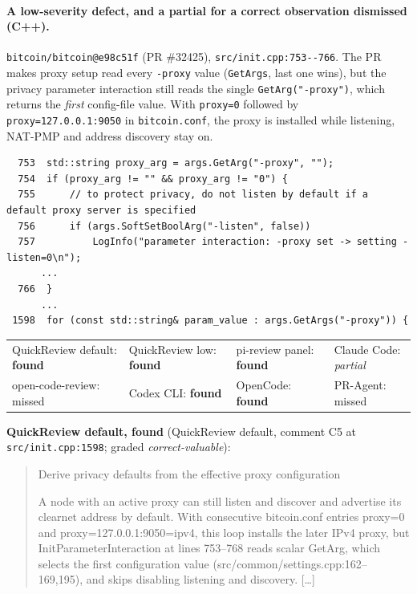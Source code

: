 \documentclass[11pt,a4paper]{article}
\newcommand{\code}[1]{\texttt{#1}}
\begin{document}
\paragraph{A low-severity defect, and a partial for a correct
observation dismissed (C++).} \code{bitcoin/\allowbreak{}bitcoin@e98c51f} (PR \#32425),
\code{src/init.cpp:753-{}-766}. The PR makes proxy setup read every
\code{-proxy} value (\code{GetArgs}, last one wins), but the privacy
parameter interaction still reads the single \code{GetArg("-proxy")},
which returns the \emph{first} config-file value. With \code{proxy=0}
followed by \code{proxy=127.0.0.1:9050} in \code{bitcoin.conf}, the proxy
is installed while listening, NAT-PMP and address discovery stay on.
{\scriptsize
\begin{verbatim}
  753  std::string proxy_arg = args.GetArg("-proxy", "");
  754  if (proxy_arg != "" && proxy_arg != "0") {
  755      // to protect privacy, do not listen by default if a default proxy server is specified
  756      if (args.SoftSetBoolArg("-listen", false))
  757          LogInfo("parameter interaction: -proxy set -> setting -listen=0\n");
      ...
  766  }
      ...
 1598  for (const std::string& param_value : args.GetArgs("-proxy")) {
\end{verbatim}
}
\begin{center}\footnotesize
\begin{tabular}{@{}llll@{}}
\hline
QuickReview default: \textbf{found} & QuickReview low: \textbf{found} & pi-review panel: \textbf{found} & Claude Code: \emph{partial} \\
open-code-review: missed & Codex CLI: \textbf{found} & OpenCode: \textbf{found} & PR-Agent: missed \\
\hline
\end{tabular}
\end{center}
\noindent\textbf{QuickReview default, found} (QuickReview default, comment C5 at \code{src/\allowbreak{}init.cpp:1598}; graded \emph{correct-valuable}):
\begin{quote}\small
Derive privacy defaults from the effective proxy configuration\par A node with an active proxy can still listen and discover and advertise its clearnet address by default. With consecutive bitcoin.conf entries proxy=0 and proxy=127.0.0.1:9050=ipv4, this loop installs the later IPv4 proxy, but InitParameterInteraction at lines 753--768 reads scalar GetArg, which selects the first configuration value (src/common/settings.cpp:162--169,195), and skips disabling listening and discovery. [\ldots]
\end{quote}
\end{document}
